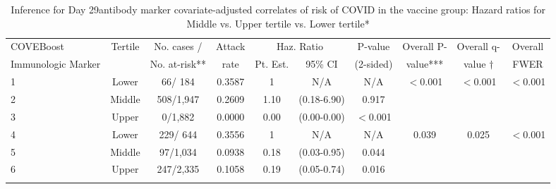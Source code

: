 \begin{longtable}{lccccccccc}
\caption{Inference for Day 29antibody marker covariate-adjusted correlates of risk of COVID in the vaccine group: Hazard ratios for Middle vs. Upper tertile vs. Lower tertile*} \\ 
   \hline
 
         \multicolumn{1}{l}{COVEBoost} & \multicolumn{1}{c}{Tertile}   & \multicolumn{1}{c}{No. cases /}   & \multicolumn{1}{c}{Attack}   & \multicolumn{2}{c}{Haz. Ratio}                     & \multicolumn{1}{c}{P-value}   & \multicolumn{1}{c}{Overall P-}      & \multicolumn{1}{c}{Overall q-}   & \multicolumn{1}{c}{Overall} \\ 
         \multicolumn{1}{l}{Immunologic Marker}            & \multicolumn{1}{c}{}          & \multicolumn{1}{c}{No. at-risk**} & \multicolumn{1}{c}{rate}   & \multicolumn{1}{c}{Pt. Est.} & \multicolumn{1}{c}{95\% CI} & \multicolumn{1}{c}{(2-sided)} & \multicolumn{1}{c}{value***} & \multicolumn{1}{c}{value $\dagger$} & \multicolumn{1}{c}{FWER} \\ 
         \hline
 
    1 & Lower & 66/  184 & 0.3587 & 1 & N/A & N/A & $<$0.001 & $<$0.001 & $<$0.001 \\ 
  2 & Middle & 508/1,947 & 0.2609 & 1.10 & (0.18-6.90) & 0.917 &     &  &  \\ 
  3 & Upper & 0/1,882 & 0.0000 & 0.00 & (0.00-0.00) & $<$0.001 &     &  &  \\ 
  4 & Lower & 229/  644 & 0.3556 & 1 & N/A & N/A & 0.039 & 0.025 & $<$0.001 \\ 
  5 & Middle & 97/1,034 & 0.0938 & 0.18 & (0.03-0.95) & 0.044 &     &  &  \\ 
  6 & Upper & 247/2,335 & 0.1058 & 0.19 & (0.05-0.74) & 0.016 &     &  &  \\ 
   \hline
\hline
\label{tab:CoR_univariable_svycoxph_cat_pretty}
\end{longtable}
